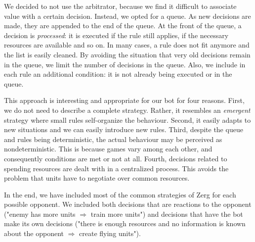 We decided to not use the arbitrator, because we find it difficult to associate value with a certain decision. Instead, we opted for a queue. As new decisions are made, they are appended to the end of the queue. At the front of the queue, a decision is \emph{processed}: it is executed if the rule still applies, if the necessary resources are available and so on. In many cases, a rule does not fit anymore and the list is easily cleaned. By avoiding the situation that very old decisions remain in the queue, we limit the number of decisions in the queue. Also, we include in each rule an additional condition: it is not already being executed or in the queue.

This approach is interesting and appropriate for our bot for four reasons. First, we do not need to describe a complete strategy. Rather, it resembles an \emph{emergent} strategy where small rules self-organize the behaviour. Second, it easily adapts to new situations and we can easily introduce new rules. Third, despite the queue and rules being deterministic, the actual behaviour may be perceived as nondeterministic. This is because games vary among each other, and consequently conditions are met or not at all. Fourth, decisions related to spending resources are dealt with in a centralized process. This avoids the problem that units have to negotiate over common resources.

In the end, we have included most of the common strategies of Zerg for each possible opponent. We included both decisions that are reactions to the opponent ("enemy has more units $\Rightarrow$ train more units") and decisions that have the bot make its own decisions ("there is enough resources and no information is known about the opponent $\Rightarrow$ create flying units"). 





%
%
%


